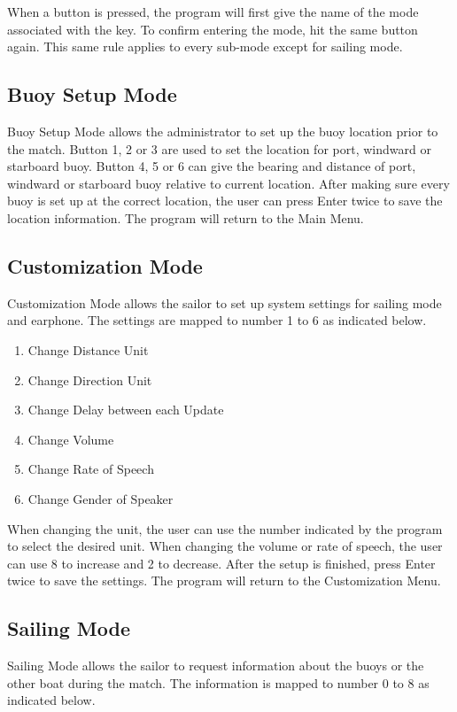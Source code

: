 \documentclass[11pt]{article}
\begin{document}
When a button is pressed, the program will first give the name of the mode associated with the key. To confirm entering the mode, hit the same button again. This same rule applies to every sub-mode except for sailing mode.

\subsection{Buoy Setup Mode}

Buoy Setup Mode allows the administrator to set up the buoy location prior to the match. Button 1, 2 or 3 are used to set the location for port, windward or starboard buoy. Button 4, 5 or 6 can give the bearing and distance of port, windward or starboard buoy relative to current location. After making sure every buoy is set up at the correct location, the user can press Enter twice to save the location information. The program will return to the Main Menu.

\subsection{Customization Mode}

Customization Mode allows the sailor to set up system settings for sailing mode and earphone. The settings are mapped to number 1 to 6 as indicated below.

\begin{enumerate}
\item Change Distance Unit
\item Change Direction Unit
\item Change Delay between each Update
\item Change Volume
\item Change Rate of Speech
\item Change Gender of Speaker
\end{enumerate}

When changing the unit, the user can use the number indicated by the program to select the desired unit. When changing the volume or rate of speech, the user can use 8 to increase and 2 to decrease. After the setup is finished, press Enter twice to save the settings. The program will return to the Customization Menu.

\subsection{Sailing Mode}

Sailing Mode allows the sailor to request information about the buoys or the other boat during the match. The information is mapped to number 0 to 8 as indicated below.
\end{document}
